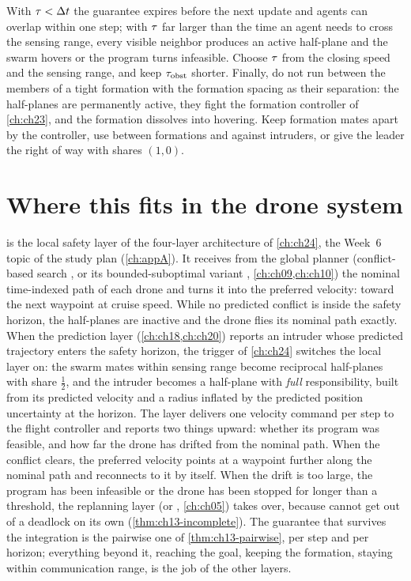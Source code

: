 \begin{pitfall}
With $\tau < \Delta t$ the guarantee expires before the next update and agents
can overlap within one step; with $\tau$ far larger than the time an agent
needs to cross the sensing range, every visible neighbor produces an
active half-plane and the swarm hovers or the program turns infeasible.
Choose $\tau$ from the closing speed and the sensing range, and keep
$\tau_{\mathrm{obst}}$ shorter. Finally, do not run \orca between the
members of a tight formation with the formation spacing as their separation:
the half-planes are permanently active, they fight the formation controller
of \cref{ch:ch23}, and the formation dissolves into hovering. Keep formation
mates apart by the controller, use \orca between formations and against
intruders, or give the leader the right of way with shares $(1, 0)$.
\end{pitfall}

\section{Where this fits in the drone system}
\label{sec:ch13-drone}

\begin{dronebox}
\orca is the local safety layer of the four-layer architecture of
\cref{ch:ch24}, the Week~6 topic of the study plan (\cref{ch:appA}). It
receives from the global planner (conflict-based search \cbs, or its
bounded-suboptimal variant \ecbs, \cref{ch:ch09,ch:ch10}) the
nominal time-indexed path of each drone and turns it into the preferred
velocity: toward the next waypoint at cruise speed. While no predicted
conflict is inside the safety horizon, the half-planes are inactive and the
drone flies its nominal path exactly. When the prediction layer
(\cref{ch:ch18,ch:ch20}) reports an intruder whose predicted trajectory
enters the safety horizon, the trigger of \cref{ch:ch24} switches the local
layer on: the swarm mates within sensing range become reciprocal
half-planes with share $\tfrac12$, and the intruder becomes a half-plane
with \emph{full} responsibility, built from its predicted velocity and a
radius inflated by the predicted position uncertainty at the horizon. The layer delivers one velocity
command per step to the flight controller and reports two things upward:
whether its program was feasible, and how far the drone has drifted from
the nominal path. When the conflict clears, the preferred velocity points at
a waypoint further along the nominal path and \orca reconnects to it by
itself. When the drift is too large, the program has been infeasible or the
drone has been stopped for longer than a threshold, the replanning layer
(\dstarlite or \astar, \cref{ch:ch05}) takes over, because \orca cannot get
out of a deadlock on its own (\cref{thm:ch13-incomplete}). The guarantee that
survives the integration is the pairwise one of \cref{thm:ch13-pairwise},
per step and per horizon; everything beyond it, reaching the goal, keeping
the formation, staying within communication range, is the job of the other
layers.
\end{dronebox}

